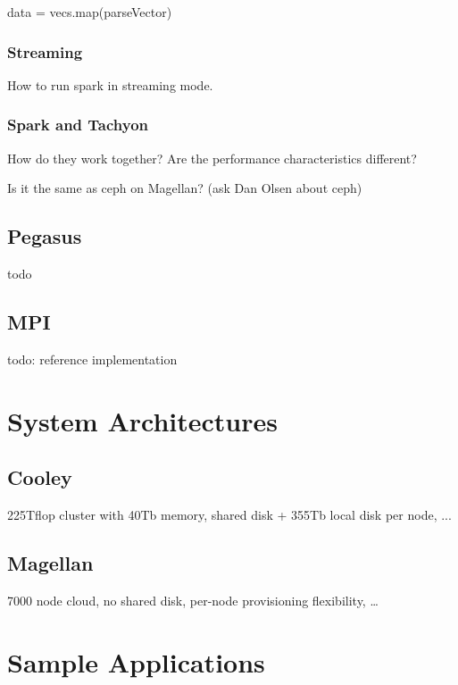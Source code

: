 data = vecs.map(parseVector)

\subsubsection{Streaming}\label{streaming-1}

How to run spark in streaming mode.

\subsubsection{Spark and Tachyon}\label{spark-and-tachyon}

How do they work together? Are the performance characteristics
different?

Is it the same as ceph on Magellan? (ask Dan Olsen about ceph)

\subsection{Pegasus}\label{pegasus}

todo

\subsection{MPI}\label{mpi}

todo: reference implementation

\section{System Architectures}\label{system-architectures}

\subsection{Cooley}\label{cooley}

225Tflop cluster with 40Tb memory, shared disk + 355Tb local disk per
node, ...

\subsection{Magellan}\label{magellan}

7000 node cloud, no shared disk, per-node provisioning flexibility,
\ldots{}

\section{Sample Applications}\label{sample-applications}


